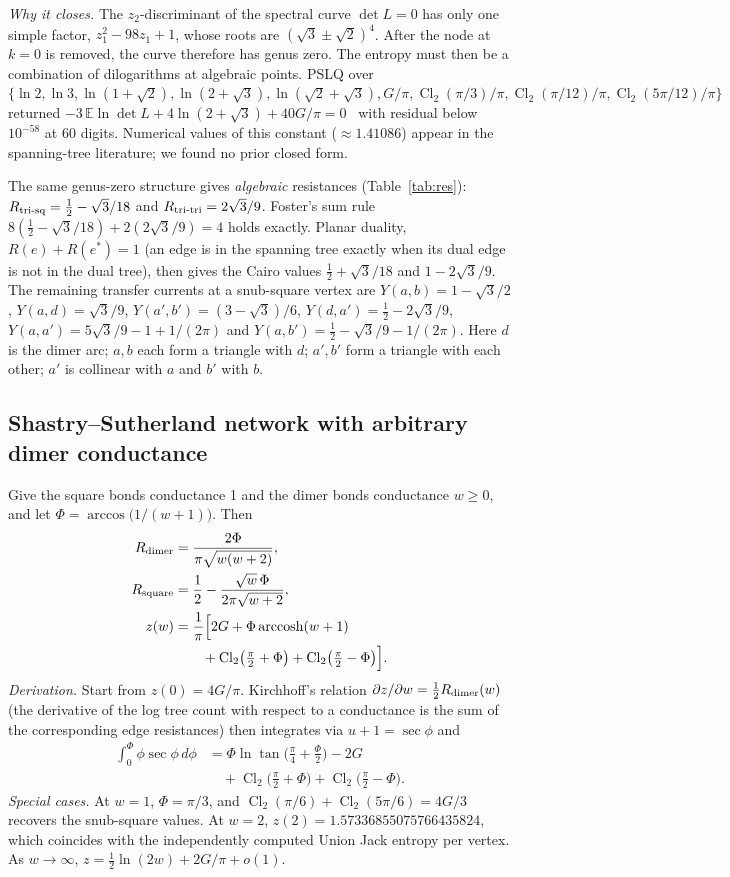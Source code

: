 \documentclass[aps,pre,10pt,twocolumn,superscriptaddress,nofootinbib]{revtex4-2}
\newcommand{\E}{\mathbb{E}}
\newcommand{\Cl}{\operatorname{Cl}_2}
\newcommand{\sq}{\sqrt{3}}
\newcommand{\arccosh}{\operatorname{arccosh}}
\begin{document}
\emph{Why it closes.} The $z_2$-discriminant of the spectral curve $\det L=0$ has only one simple factor,
$z_1^2-98z_1+1$, whose roots are $(\sq\pm\sqrt2)^4$. After the node at $k=0$ is removed, the curve therefore has genus zero. The entropy must then be
a combination of dilogarithms at algebraic points. PSLQ over
$\{\ln2,\ln3,\ln(1+\sqrt2),\ln(2+\sq),\ln(\sqrt2+\sq),G/\pi,\Cl(\pi/3)/\pi,\Cl(\pi/12)/\pi,\Cl(5\pi/12)/\pi\}$
returned $-3\,\E\ln\det L+4\ln(2+\sq)+40G/\pi=0$~\cite{PSLQ1999} with residual below $10^{-58}$ at 60 digits. Numerical values of this
constant ($\approx1.41086$) appear in the spanning-tree literature; we found no prior closed form.

The same genus-zero structure gives \emph{algebraic} resistances (Table~\ref{tab:res}):
$R_{\rm tri\text{-}sq}=\tfrac12-\sq/18$ and $R_{\rm tri\text{-}tri}=2\sq/9$. Foster's sum rule
$8(\tfrac12-\sq/18)+2(2\sq/9)=4$ holds exactly. Planar duality, $R(e)+R(e^*)=1$ (an edge is in the
spanning tree exactly when its dual edge is not in the dual tree), then gives the Cairo values
$\tfrac12+\sq/18$ and $1-2\sq/9$. The remaining transfer currents at a snub-square vertex are
$Y(a,b)=1-\sq/2$, $Y(a,d)=\sq/9$, $Y(a',b')=(3-\sq)/6$, $Y(d,a')=\tfrac12-2\sq/9$,
$Y(a,a')=5\sq/9-1+1/(2\pi)$ and $Y(a,b')=\tfrac12-\sq/9-1/(2\pi)$. Here $d$ is the dimer arc; $a,b$ each
form a triangle with $d$; $a',b'$ form a triangle with each other; $a'$ is collinear with $a$ and $b'$ with $b$.

\subsection{Shastry--Sutherland network with arbitrary dimer conductance}

Give the square bonds conductance 1 and the dimer bonds conductance $w\ge0$, and let
$\Phi=\arccos\bigl(1/(w+1)\bigr)$. Then
\begin{align}
R_{\rm dimer}&=\frac{2\Phi}{\pi\sqrt{w(w+2)}},\\
R_{\rm square}&=\frac12-\frac{\sqrt w\,\Phi}{2\pi\sqrt{w+2}},\\
z(w)&=\frac1\pi\Bigl[2G+\Phi\arccosh(w+1)\nonumber\\
&\qquad+\Cl\bigl(\tfrac\pi2+\Phi\bigr)+\Cl\bigl(\tfrac\pi2-\Phi\bigr)\Bigr].
\label{eq:ssz}
\end{align}
\emph{Derivation.} Start from $z(0)=4G/\pi$. Kirchhoff's relation
$\partial z/\partial w=\tfrac12R_{\rm dimer}(w)$ (the derivative of the log tree count with respect to a
conductance is the sum of the corresponding edge resistances) then integrates via $u+1=\sec\phi$ and
\begin{align}
\int_0^\Phi\phi\sec\phi\,d\phi&=\Phi\ln\tan\bigl(\tfrac\pi4+\tfrac\Phi2\bigr)-2G\nonumber\\
&\quad+\Cl\bigl(\tfrac\pi2+\Phi\bigr)+\Cl\bigl(\tfrac\pi2-\Phi\bigr).
\end{align}
\emph{Special cases.} At $w=1$, $\Phi=\pi/3$, and $\Cl(\pi/6)+\Cl(5\pi/6)=4G/3$ recovers the snub-square
values. At $w=2$, $z(2)=1.57336855075766435824$, which coincides with the independently computed
Union Jack entropy per vertex. As $w\to\infty$, $z=\tfrac12\ln(2w)+2G/\pi+o(1)$.
\end{document}
